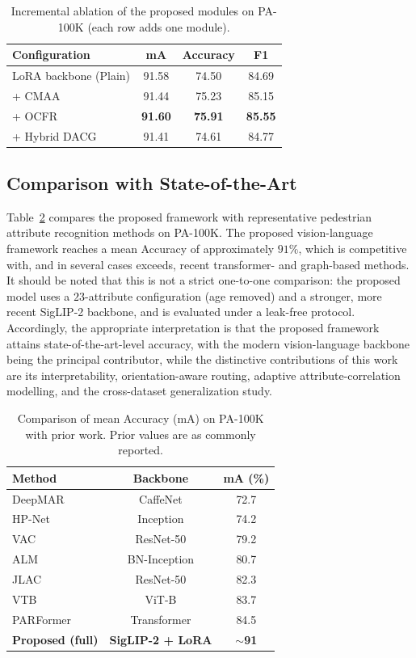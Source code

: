 \documentclass{ieeeaccess}
\begin{document}
\begin{table}[htbp]
\centering
\caption{Incremental ablation of the proposed modules on PA-100K (each row adds one module).}
\label{tab:ablation}
\begin{tabular}{|l|c|c|c|}
\hline
\rowcolor{blue!15}
\textbf{Configuration} & \textbf{mA} & \textbf{Accuracy} & \textbf{F1} \\ \hline
LoRA backbone (Plain) & 91.58 & 74.50 & 84.69 \\ \hline
\quad + CMAA          & 91.44 & 75.23 & 85.15 \\ \hline
\quad + OCFR          & \textbf{91.60} & \textbf{75.91} & \textbf{85.55} \\ \hline
\quad + Hybrid DACG   & 91.41 & 74.61 & 84.77 \\ \hline
\end{tabular}
\end{table}

\subsection{Comparison with State-of-the-Art}
Table~\ref{tab:sota} compares the proposed framework with representative pedestrian attribute
recognition methods on PA-100K. The proposed vision-language framework reaches a mean Accuracy of
approximately $91\%$, which is competitive with, and in several cases exceeds, recent transformer- and
graph-based methods. It should be noted that this is not a strict one-to-one comparison: the proposed
model uses a $23$-attribute configuration (age removed) and a stronger, more recent SigLIP-2 backbone,
and is evaluated under a leak-free protocol. Accordingly, the appropriate interpretation is that the
proposed framework attains state-of-the-art-level accuracy, with the modern vision-language backbone
being the principal contributor, while the distinctive contributions of this work are its
interpretability, orientation-aware routing, adaptive attribute-correlation modelling, and the
cross-dataset generalization study.

\begin{table}[htbp]
\centering
\caption{Comparison of mean Accuracy (mA) on PA-100K with prior work. Prior values are as commonly reported.}
\label{tab:sota}
\begin{tabular}{|l|c|c|}
\hline
\rowcolor{blue!15}
\textbf{Method} & \textbf{Backbone} & \textbf{mA (\%)} \\ \hline
DeepMAR & CaffeNet & 72.7 \\ \hline
HP-Net \cite{PA-100K} & Inception & 74.2 \\ \hline
VAC & ResNet-50 & 79.2 \\ \hline
ALM & BN-Inception & 80.7 \\ \hline
JLAC & ResNet-50 & 82.3 \\ \hline
VTB & ViT-B & 83.7 \\ \hline
PARFormer \cite{bib1} & Transformer & 84.5 \\ \hline
\textbf{Proposed (full)} & \textbf{SigLIP-2 + LoRA} & \textbf{$\sim$91} \\ \hline
\end{tabular}
\end{table}
\end{document}

